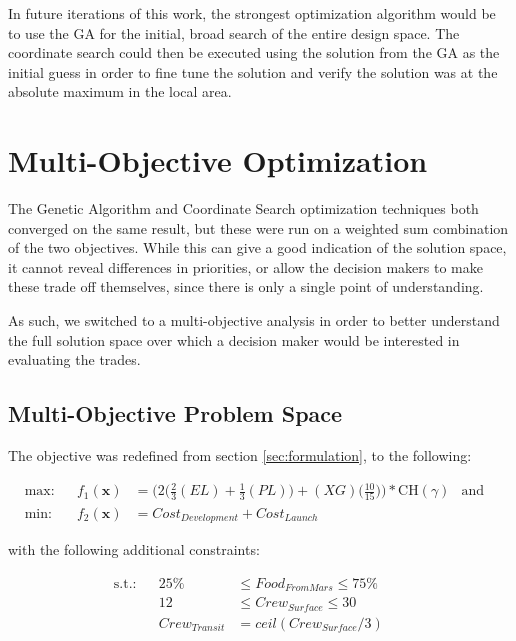 \documentclass[]{aiaa-pretty}
\begin{document}
In future iterations of this work, the strongest optimization algorithm would be to use the GA for the initial, broad search of the entire design space. The coordinate search could then be executed using the solution from the GA as the initial guess in order to fine tune the solution and verify the solution was at the absolute maximum in the local area.


\section{Multi-Objective Optimization}
\label{sec:multi}
The Genetic Algorithm and Coordinate Search optimization techniques both converged on the same result, but these were run on a weighted sum combination of the two objectives. While this can give a good indication of the solution space, it cannot reveal differences in priorities, or allow the decision makers to make these trade off themselves, since there is only a single point of understanding.

As such, we switched to a multi-objective analysis in order to better understand the full solution space over which a decision maker would be interested in evaluating the trades.

\subsection{Multi-Objective Problem Space}
\label{sec:multiprob}
The objective was redefined from section \ref{sec:formulation}, to the following:

\begin{align*}
\label{eqn:mulitobj}
\mbox{max:}& &f_1(\boldsymbol{x})&=\bigg(2\bigg(\frac{2}{3}(EL)+\frac{1}{3}(PL)\bigg)+ (XG)\bigg(\frac{10}{15}\bigg)\bigg)*\text{CH}(\gamma)& \text{and}& \\
\mbox{min:}& &f_2(\boldsymbol{x})&=Cost_{Development}+Cost_{Launch} & &
\end{align*}

 with the following additional constraints:
 
\begin{align*}
\mbox{s.t.:}& & 25\%&\leq Food_{From Mars}\leq 75\% & &\\
& & 12 &\leq Crew_{Surface} \leq 30 & &\\
& & Crew_{Transit}&=ceil(Crew_{Surface}/3)& &\\
\end{align*}
\end{document}
